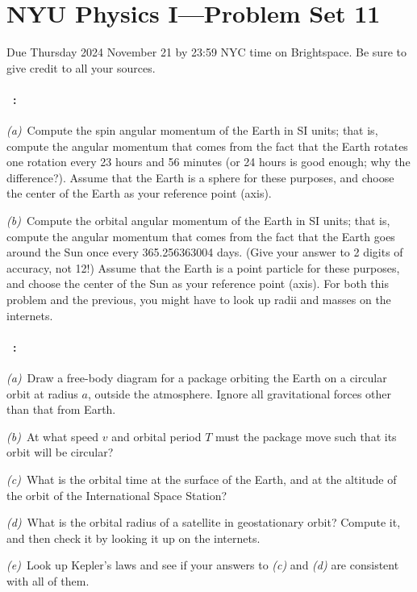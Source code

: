 \documentclass[12pt]{article}
\begin{document}
\section*{NYU Physics I---Problem Set 11}

Due Thursday 2024 November 21 by 23:59 NYC time on Brightspace.
Be sure to give credit to all your sources.

\paragraph{\problemname~\theproblem:}%
\textsl{(a)}~Compute the spin angular momentum of the Earth in SI
units; that is, compute the angular momentum that comes from the fact
that the Earth rotates one rotation every 23 hours and 56 minutes (or
24 hours is good enough; why the difference?). Assume that the Earth
is a sphere for these purposes, and choose the center of the Earth as
your reference point (axis).

\textsl{(b)}~Compute the orbital angular momentum of the Earth in SI
units; that is, compute the angular momentum that comes from the fact
that the Earth goes around the Sun once every 365.256363004
days. (Give your answer to 2 digits of accuracy, not 12!) Assume that
the Earth is a point particle for these purposes, and choose the
center of the Sun as your reference point (axis). For both this
problem and the previous, you might have to look up radii and masses
on the internets.

\paragraph{\problemname~\theproblem:}\label{package}%
\textsl{(a)}~Draw a free-body diagram for a package orbiting the Earth
on a circular orbit at radius $a$, outside the atmosphere. Ignore all
gravitational forces other than that from Earth.

\textsl{(b)}~At what speed $v$ and orbital period $T$ must the package
move such that its orbit will be circular?

\textsl{(c)}~What is the orbital time at the surface of the Earth, and
at the altitude of the orbit of the International Space Station?

\textsl{(d)}~What is the orbital radius of a satellite in geostationary
orbit? Compute it, and then check it by looking it up on the internets.

\textsl{(e)}~Look up Kepler's laws and see if your answers to
\textsl{(c)} and \textsl{(d)} are consistent with all of them.
\end{document}
